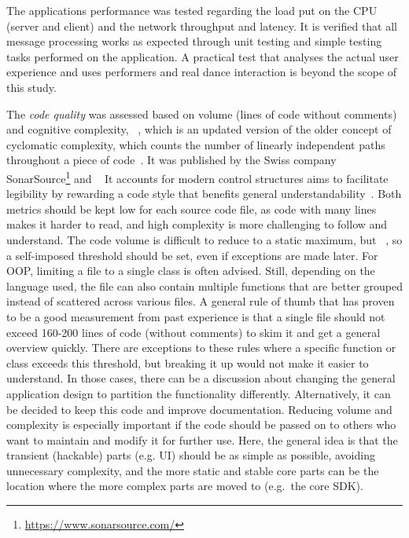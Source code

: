 The application\textquotesingle s performance was tested regarding the load put on the \ac{CPU} (server and client) and the network throughput and latency.
It is verified that all message processing works as expected through unit testing and simple testing tasks performed on the application.
A practical test that analyses the actual user experience and uses performers and real dance interaction is beyond the scope of this study.

The \emph{code quality} was assessed based on volume (lines of code without comments) and cognitive complexity, ~\parencite[see][]{sonarSourceCognitiveComplexity}, which is an updated version of the older concept of cyclomatic complexity, which counts the number of linearly independent paths throughout a piece of code~\parencite[see][]{mcCabeComplexity}.
It was published by the Swiss company SonarSource\footnote{\url{https://www.sonarsource.com/}} and ~\parencite[4]{sonarSourceCognitiveComplexity}
It accounts for modern control structures aims to facilitate legibility by rewarding a code style that benefits general understandability~\parencite[4]{sonarSourceCognitiveComplexity}.
Both metrics should be kept low for each source code file, as code with many lines makes it harder to read, and high complexity is more challenging to follow and understand.
The code volume is difficult to reduce to a static maximum, but ~\parencite[6]{softwareMetricsReliability}, so a self-imposed threshold should be set, even if exceptions are made later.
For \ac{OOP}, limiting a file to a single class is often advised.
Still, depending on the language used, the file can also contain multiple functions that are better grouped instead of scattered across various files.
A general rule of thumb that has proven to be a good measurement from past experience is that a single file should not exceed 160-200 lines of code (without comments) to skim it and get a general overview quickly.
There are exceptions to these rules where a specific function or class exceeds this threshold, but breaking it up would not make it easier to understand.
In those cases, there can be a discussion about changing the general application design to partition the functionality differently.
Alternatively, it can be decided to keep this code and improve documentation.
Reducing volume and complexity is especially important if the code should be passed on to others who want to maintain and modify it for further use.
Here, the general idea is that the transient (hackable) parts (e.g. \ac{UI}) should be as simple as possible, avoiding unnecessary complexity, and the more static and stable core parts can be the location where the more complex parts are moved to (e.g.\ the core \ac{SDK}).

